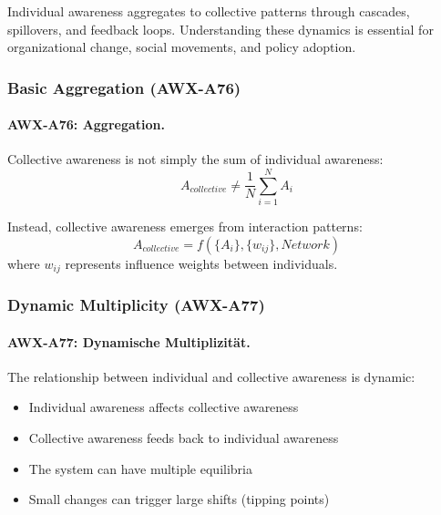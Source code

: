 
Individual awareness aggregates to collective patterns through cascades, 
spillovers, and feedback loops. Understanding these dynamics is essential 
for organizational change, social movements, and policy adoption.

\subsubsection{Basic Aggregation (AWX-A76)}

\paragraph{AWX-A76: Aggregation.}
Collective awareness is not simply the sum of individual awareness:
\begin{equation}
A_{collective} \neq \frac{1}{N} \sum_{i=1}^{N} A_i
\end{equation}

Instead, collective awareness emerges from interaction patterns:
\begin{equation}
A_{collective} = f\left(\{A_i\}, \{w_{ij}\}, Network\right)
\end{equation}
where $w_{ij}$ represents influence weights between individuals.

\subsubsection{Dynamic Multiplicity (AWX-A77)}

\paragraph{AWX-A77: Dynamische Multiplizität.}
The relationship between individual and collective awareness is dynamic:
\begin{itemize}
    \item Individual awareness affects collective awareness
    \item Collective awareness feeds back to individual awareness
    \item The system can have multiple equilibria
    \item Small changes can trigger large shifts (tipping points)
\end{itemize}

